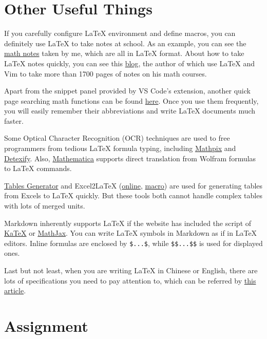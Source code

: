 \documentclass[english]{../TexTemplate/thesis}
\begin{document}
\section{Other Useful Things}
If you carefully configure \LaTeX{} environment and define macros, you can definitely use \LaTeX{} to take notes at school. As an example, you can see the \href{https://github.com/chhzh123/Notes-of-Math}{math notes} taken by me, which are all in \LaTeX{} format.
About how to take \LaTeX{} notes quickly, you can see this \href{https://castel.dev/post/lecture-notes-1/}{blog}, the author of which use \LaTeX{} and Vim to take more than 1700 pages of notes on his math courses.

Apart from the snippet panel provided by VS Code's extension, another quick page searching math functions can be found \href{https://katex.org/docs/supported.html}{here}. Once you use them frequently, you will easily remember their abbreviations and write \LaTeX{} documents much faster.

Some Optical Character Recognition (OCR) techniques are used to free programmers from tedious \LaTeX{} formula typing, including \href{https://mathpix.com/}{Mathpix} and \href{http://detexify.kirelabs.org/classify.html}{Detexify}.
Also, \href{https://www.wolfram.com/mathematica}{Mathematica} supports direct translation from Wolfram formulas to \LaTeX{} commands.

\href{https://www.tablesgenerator.com/}{Tables Generator} and Excel2LaTeX (\href{http://excel2latex.com/}{online}, \href{https://ctan.org/pkg/excel2latex?lang=en}{macro}) are used for generating tables from Excels to \LaTeX{} quickly. But these tools both cannot handle complex tables with lots of merged units.

Markdown inherently supports \LaTeX{} if the website has included the script of \href{https://katex.org/}{KaTeX} or \href{https://www.mathjax.org/}{MathJax}. You can write \LaTeX{} symbols in Markdown as if in \LaTeX{} editors. Inline formulas are enclosed by \verb'$...$', while \verb'$$...$$' is used for displayed ones.

Last but not least, when you are writing \LaTeX{} in Chinese or English, there are lots of specifications you need to pay attention to, which can be referred by \href{https://zhuanlan.zhihu.com/p/29587837}{this article}.


\newpage
\section{Assignment}
\end{document}
